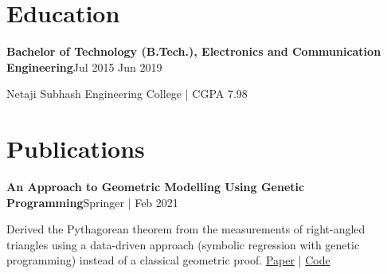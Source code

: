 \documentclass[10pt,a4paper]{article}
\newcommand{\entry}[2]{\textbf{#1}\hfill{\small\color{dim}#2}\par\vspace{1pt}}
\begin{document}
\section*{Education}
\entry{Bachelor of Technology (B.Tech.), Electronics and Communication Engineering}{Jul 2015 \textendash{} Jun 2019}
Netaji Subhash Engineering College | CGPA 7.98

\section*{Publications}
\entry{An Approach to Geometric Modelling Using Genetic Programming}{Springer | Feb 2021}
Derived the Pythagorean theorem from the measurements of right-angled triangles using a data-driven approach (symbolic regression with genetic programming) instead of a classical geometric proof.
\href{https://link.springer.com/chapter/10.1007/978-981-15-8366-7_13}{Paper} |
\href{https://github.com/snigdhasjg/Pythagorean-Triplate}{Code}
\end{document}
